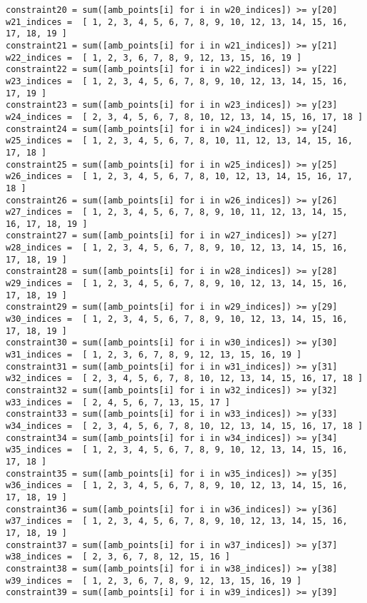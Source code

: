 \documentclass{article}
\newenvironment{code}{\captionsetup{type=listing}}{}
\begin{document}
\begin{code}
\begin{verbatim}
constraint20 = sum([amb_points[i] for i in w20_indices]) >= y[20]
w21_indices =  [ 1, 2, 3, 4, 5, 6, 7, 8, 9, 10, 12, 13, 14, 15, 16, 17, 18, 19 ]
constraint21 = sum([amb_points[i] for i in w21_indices]) >= y[21]
w22_indices =  [ 1, 2, 3, 6, 7, 8, 9, 12, 13, 15, 16, 19 ]  
constraint22 = sum([amb_points[i] for i in w22_indices]) >= y[22]
w23_indices =  [ 1, 2, 3, 4, 5, 6, 7, 8, 9, 10, 12, 13, 14, 15, 16, 17, 19 ]  
constraint23 = sum([amb_points[i] for i in w23_indices]) >= y[23]
w24_indices =  [ 2, 3, 4, 5, 6, 7, 8, 10, 12, 13, 14, 15, 16, 17, 18 ]  
constraint24 = sum([amb_points[i] for i in w24_indices]) >= y[24]
w25_indices =  [ 1, 2, 3, 4, 5, 6, 7, 8, 10, 11, 12, 13, 14, 15, 16, 17, 18 ]  
constraint25 = sum([amb_points[i] for i in w25_indices]) >= y[25]
w26_indices =  [ 1, 2, 3, 4, 5, 6, 7, 8, 10, 12, 13, 14, 15, 16, 17, 18 ]  
constraint26 = sum([amb_points[i] for i in w26_indices]) >= y[26]
w27_indices =  [ 1, 2, 3, 4, 5, 6, 7, 8, 9, 10, 11, 12, 13, 14, 15, 16, 17, 18, 19 ]  
constraint27 = sum([amb_points[i] for i in w27_indices]) >= y[27]
w28_indices =  [ 1, 2, 3, 4, 5, 6, 7, 8, 9, 10, 12, 13, 14, 15, 16, 17, 18, 19 ]
constraint28 = sum([amb_points[i] for i in w28_indices]) >= y[28]
w29_indices =  [ 1, 2, 3, 4, 5, 6, 7, 8, 9, 10, 12, 13, 14, 15, 16, 17, 18, 19 ]
constraint29 = sum([amb_points[i] for i in w29_indices]) >= y[29]
w30_indices =  [ 1, 2, 3, 4, 5, 6, 7, 8, 9, 10, 12, 13, 14, 15, 16, 17, 18, 19 ]
constraint30 = sum([amb_points[i] for i in w30_indices]) >= y[30]
w31_indices =  [ 1, 2, 3, 6, 7, 8, 9, 12, 13, 15, 16, 19 ]  
constraint31 = sum([amb_points[i] for i in w31_indices]) >= y[31]
w32_indices =  [ 2, 3, 4, 5, 6, 7, 8, 10, 12, 13, 14, 15, 16, 17, 18 ]  
constraint32 = sum([amb_points[i] for i in w32_indices]) >= y[32]
w33_indices =  [ 2, 4, 5, 6, 7, 13, 15, 17 ]  
constraint33 = sum([amb_points[i] for i in w33_indices]) >= y[33]
w34_indices =  [ 2, 3, 4, 5, 6, 7, 8, 10, 12, 13, 14, 15, 16, 17, 18 ]  
constraint34 = sum([amb_points[i] for i in w34_indices]) >= y[34]
w35_indices =  [ 1, 2, 3, 4, 5, 6, 7, 8, 9, 10, 12, 13, 14, 15, 16, 17, 18 ]  
constraint35 = sum([amb_points[i] for i in w35_indices]) >= y[35]
w36_indices =  [ 1, 2, 3, 4, 5, 6, 7, 8, 9, 10, 12, 13, 14, 15, 16, 17, 18, 19 ]
constraint36 = sum([amb_points[i] for i in w36_indices]) >= y[36]
w37_indices =  [ 1, 2, 3, 4, 5, 6, 7, 8, 9, 10, 12, 13, 14, 15, 16, 17, 18, 19 ]
constraint37 = sum([amb_points[i] for i in w37_indices]) >= y[37]
w38_indices =  [ 2, 3, 6, 7, 8, 12, 15, 16 ]  
constraint38 = sum([amb_points[i] for i in w38_indices]) >= y[38]
w39_indices =  [ 1, 2, 3, 6, 7, 8, 9, 12, 13, 15, 16, 19 ]  
constraint39 = sum([amb_points[i] for i in w39_indices]) >= y[39]


\end{verbatim}
\end{code}
\end{document}
